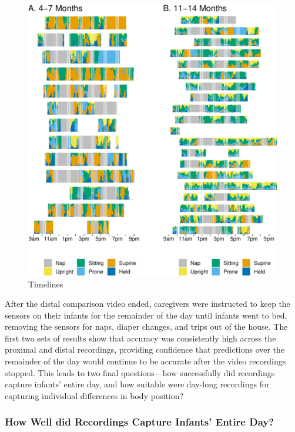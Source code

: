 \documentclass[
  man]{apa6}
\begin{document}
\begin{figure}

{\centering \includegraphics{manuscript_files/figure-latex/timelines-1} 

}

\caption{Timelines}\label{fig:timelines}
\end{figure}

After the distal comparison video ended, caregivers were instructed to keep the sensors on their infants for the remainder of the day until infants went to bed, removing the sensors for naps, diaper changes, and trips out of the house. The first two sets of results show that accuracy was consistently high across the proximal and distal recordings, providing confidence that predictions over the remainder of the day would continue to be accurate after the video recordings stopped. This leads to two final questions---how successfully did recordings capture infants' entire day, and how suitable were day-long recordings for capturing individual differences in body position?

\hypertarget{how-well-did-recordings-capture-infants-entire-day}{%
\subsubsection{How Well did Recordings Capture Infants' Entire Day?}\label{how-well-did-recordings-capture-infants-entire-day}}
\end{document}
